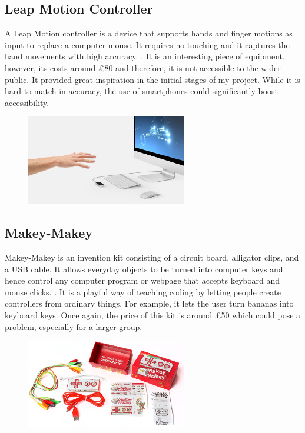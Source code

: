 \documentclass{l4proj}
\begin{document}
\subsection{Leap Motion Controller}
A Leap Motion controller is a device that supports hands and finger motions as input to replace a computer mouse. It requires no touching and it captures the hand movements with high accuracy. \cite{leap}. It is an interesting piece of equipment, however, its costs around £80 and therefore, it is not accessible to the wider public. It provided great inspiration in the initial stages of my project. While it is hard to match in accuracy, the use of smartphones could significantly boost accessibility.

\begin{figure}[h!]
    \centering
    \includegraphics[width=7cm]{./images/leap.jpg}
    \caption{\cite{leap_pic}}
    \label{fig:leap}
\end{figure}

\subsection{Makey-Makey}
Makey-Makey is an invention kit consisting of a circuit board, alligator clips, and a USB cable. It allows everyday objects to be turned into computer keys and hence control any computer program or webpage that accepts keyboard and mouse clicks. \cite{makey}. It is a playful way of teaching coding by letting people create controllers from ordinary things. For example, it lets the user turn bananas into keyboard keys. Once again, the price of this kit is around £50 which could pose a problem, especially for a larger group.  

\begin{figure}[h!]
    \centering
    \includegraphics[width=7cm]{./images/makey.jpg}
    \caption{\cite{makey_pic}}
    \label{fig:makey}
\end{figure}
\end{document}
